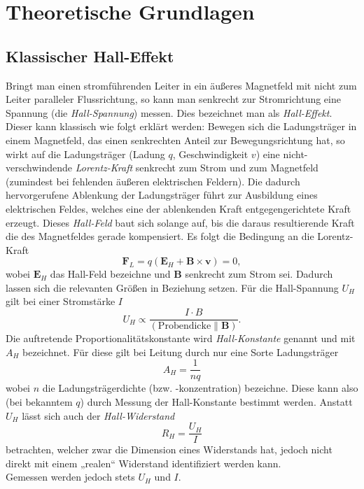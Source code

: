 \section{Theoretische Grundlagen}

\renewcommand{\V}[1]{\textbf{#1}}

\subsection{Klassischer Hall-Effekt}\label{sec:HallEffekt}

Bringt man einen stromführenden Leiter in ein äußeres Magnetfeld mit nicht zum Leiter paralleler Flussrichtung, so kann man senkrecht zur Stromrichtung eine Spannung (die \emph{Hall-Spannung}) messen. Dies bezeichnet man als \emph{Hall-Effekt}.
Dieser kann klassisch wie folgt erklärt werden:
Bewegen sich die Ladungsträger in einem Magnetfeld, das einen senkrechten Anteil zur Bewegungsrichtung hat, so wirkt auf die Ladungsträger (Ladung $q$, Geschwindigkeit $v$) eine nicht-verschwindende \emph{Lorentz-Kraft} senkrecht zum Strom und zum Magnetfeld (zumindest bei fehlenden äußeren elektrischen Feldern). Die dadurch hervorgerufene Ablenkung der Ladungsträger führt zur Ausbildung eines elektrischen Feldes, welches eine der ablenkenden Kraft entgegengerichtete Kraft erzeugt. Dieses \emph{Hall-Feld} baut sich solange auf, bis die daraus resultierende Kraft die des Magnetfeldes gerade kompensiert.
Es folgt die Bedingung an die Lorentz-Kraft
$$\V F_L = q(\V E_H + \V B\times \V v) = 0,$$
wobei $\V E_H$ das Hall-Feld bezeichne und $\V B$ senkrecht zum Strom sei.
Dadurch lassen sich die relevanten Größen in Beziehung setzen. Für die Hall-Spannung $U_H$ gilt bei einer Stromstärke $I$
\begin{equation}\label{eq:HallSpannung}
U_H\propto\frac{I\cdot B}{(\text{Probendicke}\parallel \V B)}.
\end{equation}
Die auftretende Proportionalitätskonstante wird \emph{Hall-Konstante} genannt und mit $A_H$ bezeichnet. Für diese gilt bei Leitung durch nur eine Sorte Ladungsträger
\begin{equation}
A_H = \frac{1}{nq}
\end{equation}
wobei $n$ die Ladungsträgerdichte (bzw. -konzentration) bezeichne. Diese kann also (bei
bekanntem $q$) durch Messung der Hall-Konstante bestimmt werden.
Anstatt $U_H$ lässt sich auch der \emph{Hall-Widerstand}
\begin{equation}\label{eq:HallWiderstand}
R_H = \frac{U_H}{I}
\end{equation}
betrachten, welcher zwar die Dimension eines Widerstands hat, jedoch nicht direkt mit einem „realen“ Widerstand identifiziert werden kann.\\
Gemessen werden jedoch stets $U_H$ und $I$.

